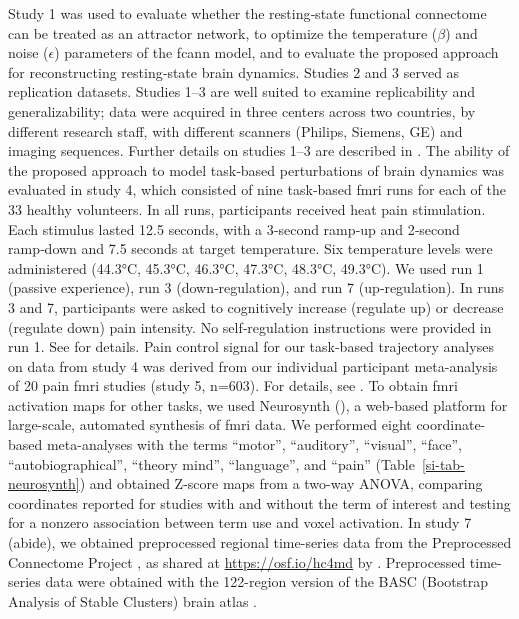 \documentclass{article}
\begin{document}
Study 1 was used to evaluate whether the resting‑state functional connectome can be treated as an attractor network, to optimize the temperature ($\beta$) and noise ($\epsilon$) parameters of the \acrshort{fcann} model, and to evaluate the proposed approach for reconstructing resting‑state brain dynamics. Studies 2 and 3 served as replication datasets. Studies 1--3 are well suited to examine replicability and generalizability; data were acquired in three centers across two countries, by different research staff, with different scanners (Philips, Siemens, GE) and imaging sequences. Further details on studies 1--3 are described in \cite{Spisak_2020}. The ability of the proposed approach to model task‑based perturbations of brain dynamics was evaluated in study 4, which consisted of nine task‑based \acrshort{fmri} runs for each of the 33 healthy volunteers. In all runs, participants received heat pain stimulation. Each stimulus lasted 12.5 seconds, with a 3‑second ramp‑up and 2‑second ramp‑down and 7.5 seconds at target temperature. Six temperature levels were a\acrshort{dm}inistered (44.3°C, 45.3°C, 46.3°C, 47.3°C, 48.3°C, 49.3°C). We used run 1 (passive experience), run 3 (down‑regulation), and run 7 (up‑regulation). In runs 3 and 7, participants were asked to cognitively increase (regulate up) or decrease (regulate down) pain intensity. No self‑regulation instructions were provided in run 1. See \citet{woo2015distinct} for details.
Pain control signal for our task-based trajectory analyses on data from study 4 was derived from our individual participant meta-analysis of 20 pain \acrshort{fmri} studies (study 5, n=603). For details, see \citet{zunhammer2021meta}.
To obtain \acrshort{fmri} activation maps for other tasks, we used Neurosynth (\cite{Tor_D__2011}), a web-based platform for large-scale, automated synthesis of \acrshort{fmri} data. We performed eight coordinate-based meta-analyses with the terms ``motor'', ``auditory'', ``visual'', ``face'', ``autobiographical'', ``theory mind'', ``language'', and ``pain'' (Table~\ref{si-tab-neurosynth}) and obtained Z-score maps from a two-way ANOVA, comparing coordinates reported for studies with and without the term of interest and testing for a nonzero association between term use and voxel activation.
In study 7 (\acrshort{abide}), we obtained preprocessed regional time-series data from the Preprocessed Connectome Project \citep{craddock2013towards}, as shared at \href{https://osf.io/hc4md}{https://osf.io/hc4md} by \citet{dadi2019benchmarking}. Preprocessed time-series data were obtained with the 122-region version of the BASC (Bootstrap Analysis of Stable Clusters) brain atlas \citep{bellec2010multi}.
\end{document}
